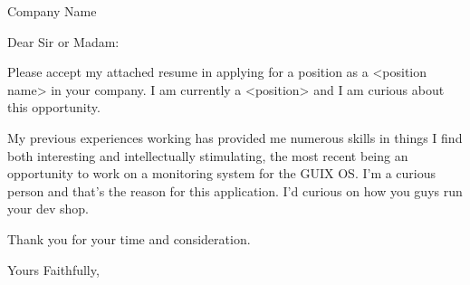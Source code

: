 \documentclass{letter}
\begin{document}
\begin{letter}{Company Name}
  \opening{Dear Sir or Madam:}


  Please accept my attached resume in applying for a position as a <position
  name> in your company. I am currently a <position> and I am curious about this
  opportunity.


  My previous experiences working has provided me numerous skills in things I
  find both interesting and intellectually stimulating, the most recent being an
  opportunity to work on a monitoring system for the GUIX OS. I'm a curious
  person and that's the reason for this application. I'd curious on how you guys
  run your dev shop.


  Thank you for your time and consideration.

  \closing{Yours Faithfully,}
\end{letter}
\end{document}
